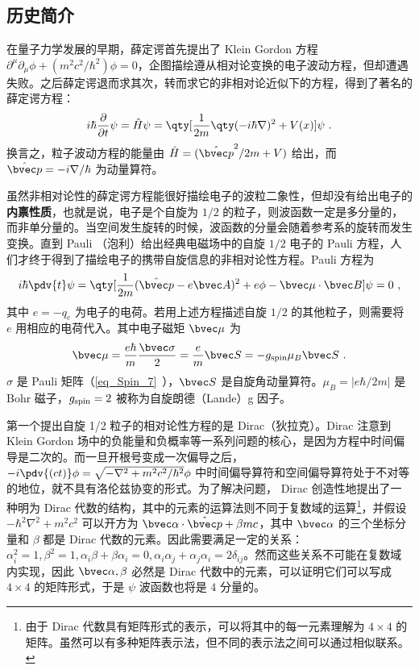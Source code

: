 
\subsection{历史简介}
在量子力学发展的早期，薛定谔首先提出了 Klein Gordon 方程 $\partial^\mu \partial_\mu \phi+(m^2c^2/\hbar^2)\phi=0$，企图描绘遵从相对论变换的电子波动方程，但却遭遇失败。之后薛定谔退而求其次，转而求它的非相对论近似下的方程，得到了著名的薛定谔方程：
\begin{equation}
i\hbar \frac{\partial }{\partial t}\psi = \hat H\psi=\qty[\frac{ 1}{2m}\qty(-i\hbar\nabla)^2+V(x)]\psi~.
\end{equation}
换言之，粒子波动方程的能量由 $\hat H=(\hat{\bvec p}^2/2m+V)$ 给出，而 $\hat{\bvec p}=-i\nabla/\hbar$ 为动量算符。

虽然非相对论性的薛定谔方程能很好描绘电子的波粒二象性，但却没有给出电子的\textbf{内禀性质}，也就是说，电子是个自旋为 $1/2$ 的粒子，则波函数一定是多分量的，而非单分量的。当空间发生旋转的时候，波函数的分量会随着参考系的旋转而发生变换。直到 Pauli （泡利）给出经典电磁场中的自旋 $1/2$ 电子的 Pauli 方程，人们才终于得到了描绘电子的携带自旋信息的非相对论性方程。Pauli 方程为
\begin{equation}
i\hbar\pdv{t} \psi=\qty[\frac{1}{2m}(\hat{\bvec p}-e\bvec A)^2+e\phi-\bvec \mu\cdot \bvec B]\psi = 0~,
\end{equation}
其中 $e=-q_e$ 为电子的电荷。若用上述方程描述自旋 $1/2$ 的其他粒子，则需要将 $e$ 用相应的电荷代入。其中电子磁矩 $\bvec \mu$ 为
\begin{equation}
\bvec \mu = \frac{e\hbar}{m}\frac{\bvec \sigma}{2}=\frac{e}{m}\bvec S=-g_{\rm spin}\mu_B \bvec S~.
\end{equation}
$\sigma$ 是 Pauli 矩阵（\autoref{eq_Spin_7}~），$\bvec S$ 是自旋角动量算符。$\mu_B=|e\hbar/2m|$ 是 Bohr 磁子，$g_{\rm spin}=2$ 被称为自旋朗德（Lande）g 因子。

第一个提出自旋 1/2 粒子的相对论性方程的是 Dirac（狄拉克）。Dirac 注意到 Klein Gordon 场中的负能量和负概率等一系列问题的核心，是因为方程中时间偏导是二次的。而一旦开根号变成一次偏导之后，$-i\pdv{(ct)} \phi=\sqrt{-\nabla^2+m^2c^2/\hbar^2}\phi$ 中时间偏导算符和空间偏导算符处于不对等的地位，就不具有洛伦兹协变的形式。为了解决问题， Dirac 创造性地提出了一种明为 Dirac 代数的结构，其中的元素的运算法则不同于复数域的运算\footnote{由于 Dirac 代数具有矩阵形式的表示，可以将其中的每一元素理解为 $4\times 4$ 的矩阵。虽然可以有多种矩阵表示法，但不同的表示法之间可以通过相似联系。}，并假设 $-\hbar^2\nabla^2+m^2c^2$ 可以开方为 $\bvec \alpha \cdot \hat{\bvec p}+\beta mc$，其中 $\bvec \alpha$ 的三个坐标分量和 $\beta$ 都是 Dirac 代数的元素。因此需要满足一定的关系：$\alpha_i^2=1,\beta^2=1,\alpha_i\beta+\beta \alpha_i=0,\alpha_i\alpha_j+\alpha_j\alpha_i=2\delta_{ij}$。然而这些关系不可能在复数域内实现，因此 $\bvec \alpha,\beta$ 必然是 Dirac 代数中的元素，可以证明它们可以写成 $4\times 4$ 的矩阵形式，于是 $\psi$ 波函数也将是 $4$ 分量的。

